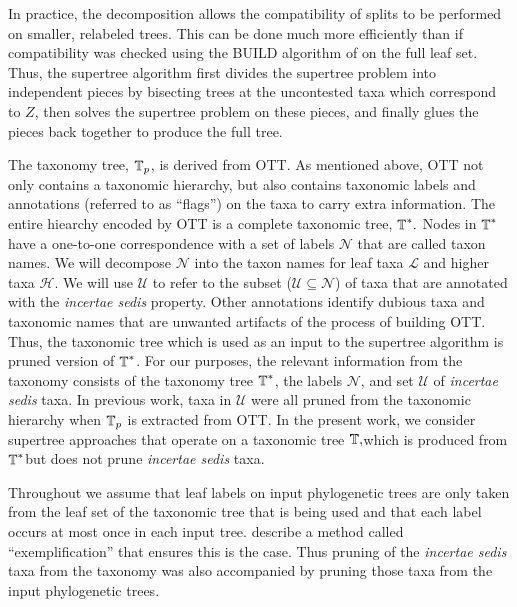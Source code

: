 \documentclass[english]{article}
\begin{document}
In practice, the decomposition allows the compatibility of splits to
be performed on smaller, relabeled trees. This can be done much more
efficiently than if compatibility was checked using the BUILD
algorithm of \citet{AhoSSU1981} on the full leaf set. Thus, the
supertree algorithm first divides the supertree problem into
independent pieces by bisecting trees at the uncontested taxa which
correspond to $Z$, then solves the supertree problem on these pieces,
and finally glues the pieces back together to produce the full tree.

The taxonomy tree, $\mbox{\ensuremath{\mathbb{T}}}_{p}$, is derived from OTT. As mentioned
above, OTT not only contains a taxonomic hierarchy, but also contains
taxonomic labels and annotations (referred to as ``flags'') on the
taxa to carry extra information. The entire hiearchy encoded by OTT is
a complete taxonomic tree, $\mbox{\ensuremath{\mathbb{T}}}^{\ast}.$ Nodes in
$\mbox{\ensuremath{\mathbb{T}}}^{\ast}$ have a one-to-one correspondence with a set of
labels $\mathcal{N}$ that are called taxon names. We will decompose
$\mathcal{N}$ into the taxon names for leaf taxa \emph{$\mathcal{L}$
}and higher taxa $\mathcal{H}$. We will use $\mathcal{U}$ to refer to
the subset ($\mathcal{U}\subseteq\mathcal{N}$) of taxa that are
annotated with the \emph{incertae sedis }property. Other annotations
identify dubious taxa and taxonomic names that are unwanted artifacts
of the process of building OTT. Thus, the taxonomic tree which is used
as an input to the supertree algorithm is pruned version of
$\mbox{\ensuremath{\mathbb{T}}}^{\ast}$. For our purposes, the relevant information from
the taxonomy consists of the taxonomy tree $\mbox{\ensuremath{\mathbb{T}}}^{\ast}$, the
labels $\mathcal{N}$, and set $\mathcal{U}$ of \emph{incertae sedis
}taxa. In previous work, taxa in $\mathcal{U}$ were all pruned from
the taxonomic hierarchy when $\mbox{\ensuremath{\mathbb{T}}}_{p}$ is extracted from OTT. In
the present work, we consider supertree approaches that operate on a
taxonomic tree $\mbox{\ensuremath{\mathbb{T}}},$which is produced from
$\mbox{\ensuremath{\mathbb{T}}}^{\ast}$but does not prune \emph{incertae sedis} taxa.

Throughout we assume that leaf labels on input phylogenetic trees are
only taken from the leaf set of the taxonomic tree that is being used
and that each label occurs at most once in each input tree.
\citet{redelings2017supertree} describe a method called
``exemplification'' that ensures this is the case. Thus pruning of the
\emph{incertae sedis} taxa from the taxonomy was also accompanied by
pruning those taxa from the input phylogenetic trees.
\end{document}
